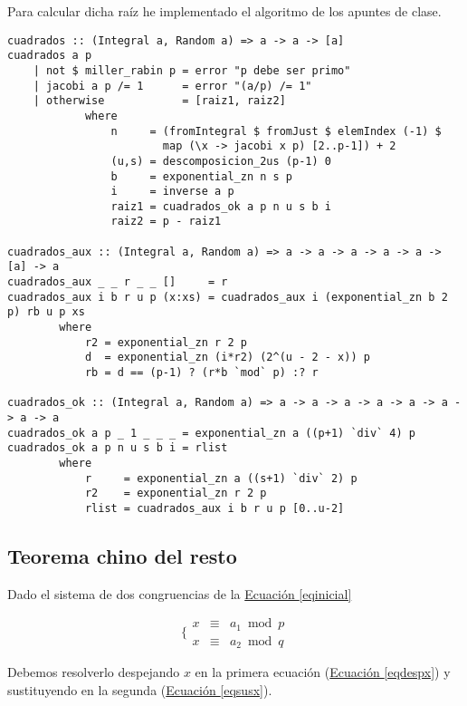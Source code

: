 \documentclass[10pt,spanish]{article}
\begin{document}
Para calcular dicha raíz he implementado el algoritmo de los apuntes de clase.

\begin{verbatim}
cuadrados :: (Integral a, Random a) => a -> a -> [a]
cuadrados a p
    | not $ miller_rabin p = error "p debe ser primo"
    | jacobi a p /= 1      = error "(a/p) /= 1"
    | otherwise            = [raiz1, raiz2]
            where
                n     = (fromIntegral $ fromJust $ elemIndex (-1) $ 
                        map (\x -> jacobi x p) [2..p-1]) + 2
                (u,s) = descomposicion_2us (p-1) 0
                b     = exponential_zn n s p
                i     = inverse a p
                raiz1 = cuadrados_ok a p n u s b i
                raiz2 = p - raiz1

cuadrados_aux :: (Integral a, Random a) => a -> a -> a -> a -> a -> [a] -> a
cuadrados_aux _ _ r _ _ []     = r
cuadrados_aux i b r u p (x:xs) = cuadrados_aux i (exponential_zn b 2 p) rb u p xs
        where
            r2 = exponential_zn r 2 p
            d  = exponential_zn (i*r2) (2^(u - 2 - x)) p
            rb = d == (p-1) ? (r*b `mod` p) :? r

cuadrados_ok :: (Integral a, Random a) => a -> a -> a -> a -> a -> a -> a -> a
cuadrados_ok a p _ 1 _ _ _ = exponential_zn a ((p+1) `div` 4) p
cuadrados_ok a p n u s b i = rlist
        where
            r     = exponential_zn a ((s+1) `div` 2) p
            r2    = exponential_zn r 2 p
            rlist = cuadrados_aux i b r u p [0..u-2]
\end{verbatim}

\subsection{\textcolor{rojo}Teorema chino del resto}
Dado el sistema de dos congruencias de la \hyperref[eqinicial]{Ecuación \ref*{eqinicial}}

\begin{equation}
\label{eqinicial}
\Bigg\{ \begin{matrix}
    x & \equiv & a_1 \bmod p\\
    x & \equiv & a_2 \bmod q
\end{matrix}
\end{equation}

Debemos resolverlo despejando $x$ en la primera ecuación (\hyperref[eqdespx]{Ecuación \ref*{eqdespx}}) y sustituyendo en la segunda (\hyperref[eqsusx]{Ecuación \ref*{eqsusx}}).
\end{document}
